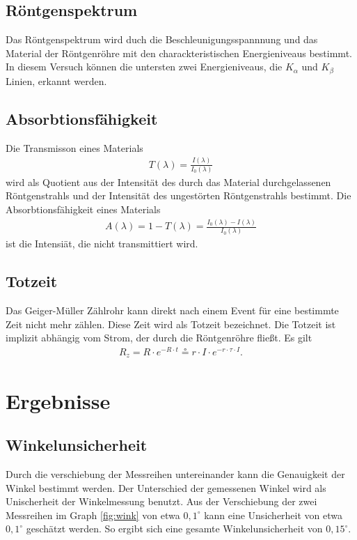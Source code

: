 \documentclass[11pt, a4paper]{article}
\begin{document}
    \subsection{Röntgenspektrum}

    Das Röntgenspektrum wird duch die Beschleunigungsspannnung und das Material der Röntgenröhre mit den charackteristischen Energieniveaus bestimmt. In diesem Versuch können die untersten zwei Energieniveaus, die $K_{\alpha}$ und $K_{\beta}$ Linien, erkannt werden.
    \subsection{Absorbtionsfähigkeit}

    Die Transmisson eines Materials
    \begin{align}
        T(\lambda) = \frac{I(\lambda)}{I_{0}(\lambda)} \label{eq:transmission}
    \end{align}
    wird als Quotient aus der Intensität des durch das Material durchgelassenen Röntgenstrahls und der Intensität des ungestörten Röntgenstrahls bestimmt. Die Absorbtionsfähigkeit eines Materials
    \begin{align}
        A(\lambda) = 1 - T(\lambda) = \frac{I_{0}(\lambda) - I(\lambda)}{I_{0}(\lambda)}
    \end{align}
    ist die Intensiät, die nicht transmittiert wird.

    \subsection{Totzeit}
    Das Geiger-Müller Zählrohr kann direkt nach einem Event für eine bestimmte Zeit nicht mehr zählen. Diese Zeit wird als Totzeit bezeichnet. Die Totzeit ist implizit abhängig vom Strom, der durch die Röntgenröhre fließt. Es gilt
    \begin{align}
        R_{z} = R \cdot e^{-R \cdot t} \circeq r \cdot I \cdot e^{-r \cdot \tau \cdot I}. \label{eq:totzeit}
    \end{align}

    \section{Ergebnisse}

    \subsection{Winkelunsicherheit}
    Durch die verschiebung der Messreihen untereinander kann die Genauigkeit der Winkel bestimmt werden. Der Unterschied der gemessenen Winkel wird als Unischerheit der Winkelmessung benutzt. Aus der Verschiebung der zwei Messreihen im Graph \ref{fig:wink} von etwa $0,1^{\circ}$ kann eine Unsicherheit von etwa $0,1^{\circ}$ geschätzt werden. So ergibt sich eine gesamte Winkelunsicherheit von $0,15^{\circ}$.
\end{document}
